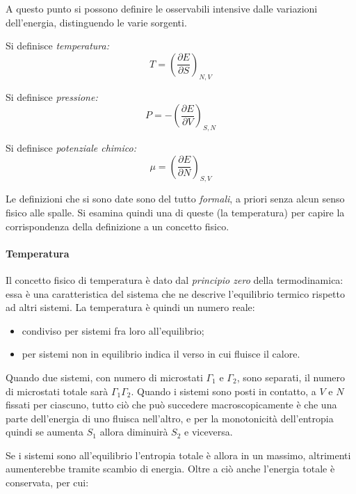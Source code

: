 A questo punto si possono definire le osservabili intensive dalle variazioni dell'energia, distinguendo le varie sorgenti.

\begin{defn}
	\label{def:ossint}
	Si definisce \textit{temperatura:}
	\begin{equation*}
	T = \left(\frac{\partial E}{\partial S}\right)_{N,V}
	\end{equation*}
	
	Si definisce \textit{pressione:}
	\begin{equation*}
	P = - \left(\frac{\partial E}{\partial V}\right)_{S,N}
	\end{equation*}
	
	Si definisce \textit{potenziale chimico:}
	\begin{equation*}
	\mu = \left(\frac{\partial E}{\partial N}\right)_{S,V}
	\end{equation*}
\end{defn}

Le definizioni che si sono date sono del tutto \textit{formali}, a priori senza alcun senso fisico alle spalle. Si esamina quindi una di queste (la temperatura) per capire la corrispondenza della definizione a un concetto fisico.

\paragraph{Temperatura} Il concetto fisico di temperatura è dato dal \textit{principio zero} della termodinamica: essa è una caratteristica del sistema che ne descrive l'equilibrio termico rispetto ad altri sistemi. La temperatura è quindi un numero reale:
\begin{itemize}
	\item condiviso per sistemi fra loro all'equilibrio;
	\item per sistemi non in equilibrio indica il verso in cui fluisce il calore.
\end{itemize}

Quando due sistemi, con numero di microstati $\Gamma_1$ e $\Gamma_2$, sono separati, il numero di microstati totale sarà $\Gamma_1\Gamma_2$.
Quando i sistemi sono posti in contatto, a $V$ e $N$ fissati per ciascuno, tutto ciò che può succedere macroscopicamente è che una parte dell'energia di uno fluisca nell'altro, e per la monotonicità dell'entropia quindi se aumenta $S_1$ allora diminuirà $S_2$ e viceversa.

Se i sistemi sono all'equilibrio l'entropia totale è allora in un massimo, altrimenti aumenterebbe tramite scambio di energia. Oltre a ciò anche l'energia totale è conservata, per cui:

